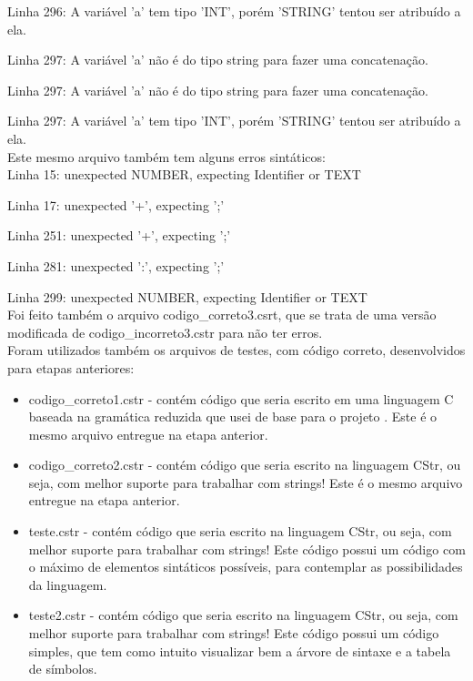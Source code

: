 \documentclass[12pt]{article}
\begin{document}
Linha 296: A variável 'a' tem tipo 'INT', porém 'STRING' tentou ser atribuído a ela.

Linha 297: A variável 'a' não é do tipo string para fazer uma concatenação.

Linha 297: A variável 'a' não é do tipo string para fazer uma concatenação.

Linha 297: A variável 'a' tem tipo 'INT', porém 'STRING' tentou ser atribuído a ela.\\


Este mesmo arquivo também tem alguns erros sintáticos:\\

Linha 15: unexpected NUMBER, expecting Identifier or TEXT

Linha 17: unexpected '+', expecting ';'

Linha 251: unexpected '+', expecting ';'

Linha 281: unexpected ':', expecting ';'

Linha 299: unexpected NUMBER, expecting Identifier or TEXT\\

Foi feito também o arquivo codigo\_correto3.csrt, que se trata de uma versão modificada de codigo\_incorreto3.cstr para não ter erros.\\

Foram utilizados também os arquivos de testes, com código correto, desenvolvidos para etapas anteriores:

\begin{itemize}
	\item codigo\_correto1.cstr - contém código que seria escrito em uma linguagem C baseada na gramática reduzida que usei de base para o projeto \cite{minic}. Este é o mesmo arquivo entregue na etapa anterior.
	\item codigo\_correto2.cstr - contém código que seria escrito na linguagem CStr, ou seja, com melhor suporte para trabalhar com strings! Este é o mesmo arquivo entregue na etapa anterior.
	\item teste.cstr - contém código que seria escrito na linguagem CStr, ou seja, com melhor suporte para trabalhar com strings! Este código possui um código com o máximo de elementos sintáticos possíveis, para contemplar as possibilidades da linguagem.
	\item teste2.cstr - contém código que seria escrito na linguagem CStr, ou seja, com melhor suporte para trabalhar com strings! Este código possui um código simples, que tem como intuito visualizar bem a árvore de sintaxe e a tabela de símbolos.\\
\end{itemize}
\end{document}
